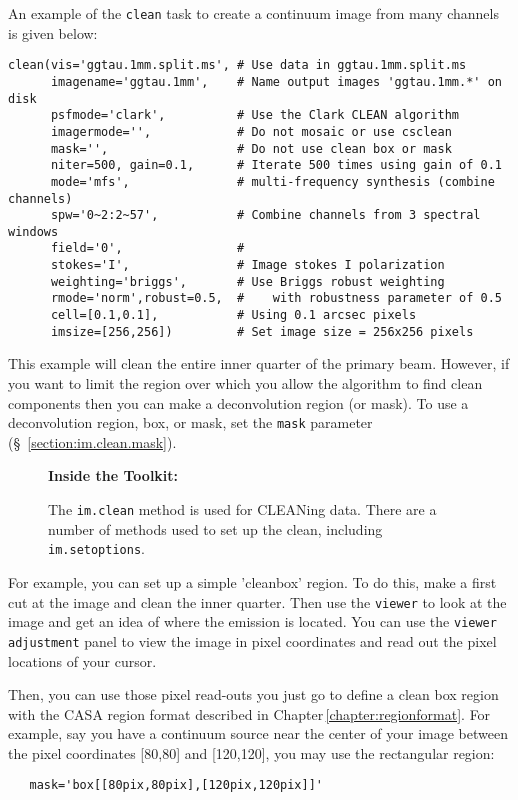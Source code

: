 An example of the {\tt clean} task to
create a continuum image from many channels is given below: 
\small
\begin{verbatim}
clean(vis='ggtau.1mm.split.ms', # Use data in ggtau.1mm.split.ms
      imagename='ggtau.1mm',    # Name output images 'ggtau.1mm.*' on disk
      psfmode='clark',          # Use the Clark CLEAN algorithm
      imagermode='',            # Do not mosaic or use csclean
      mask='',                  # Do not use clean box or mask
      niter=500, gain=0.1,      # Iterate 500 times using gain of 0.1
      mode='mfs',               # multi-frequency synthesis (combine channels)
      spw='0~2:2~57',           # Combine channels from 3 spectral windows
      field='0',                # 
      stokes='I',               # Image stokes I polarization
      weighting='briggs',       # Use Briggs robust weighting 
      rmode='norm',robust=0.5,  #    with robustness parameter of 0.5
      cell=[0.1,0.1],           # Using 0.1 arcsec pixels
      imsize=[256,256])         # Set image size = 256x256 pixels

\end{verbatim}
\normalsize

This example will clean the entire inner quarter of the primary beam.
However, if you want to limit the region over which you allow the
algorithm to find clean components then you can make a deconvolution
region (or mask).  To use a deconvolution region, box, or mask, set
the {\tt mask} parameter (\S~\ref{section:im.clean.mask}).

\begin{wrapfigure}{r}{2.5in}
  \begin{boxedminipage}{2.5in}
     \centerline{\bf Inside the Toolkit:}
     The {\tt im.clean} method is used for CLEANing data.
     There are a number of methods used to set up the clean,
     including {\tt im.setoptions}.
  \end{boxedminipage}
\end{wrapfigure}

For example, you can set up a simple 'cleanbox' region.  To do this, make
a first cut at the image and clean the inner quarter.  Then use the
{\tt viewer} to look at the image and get an idea of where the
emission is located.  You can use the {\tt viewer adjustment} panel to
view the image in pixel coordinates and read out the pixel locations
of your cursor.  

Then, you can use those pixel read-outs you just go to define a clean
box region with the CASA region format described in
Chapter\,\ref{chapter:regionformat}. For example, say you have a
continuum source near the center of your image between the pixel
coordinates [80,80] and [120,120], you may use the rectangular region: 
\small
\begin{verbatim}
   mask='box[[80pix,80pix],[120pix,120pix]]' 
\end{verbatim}
\normalsize

